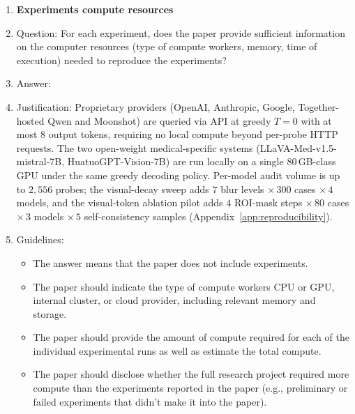 \begin{enumerate}
\item {\bf Experiments compute resources}
    \item[] Question: For each experiment, does the paper provide sufficient information on the computer resources (type of compute workers, memory, time of execution) needed to reproduce the experiments?
    \item[] Answer: \answerYes{}
    \item[] Justification: Proprietary providers (OpenAI, Anthropic, Google, Together-hosted Qwen and Moonshot) are queried via API at greedy $T{=}0$ with at most $8$ output tokens, requiring no local compute beyond per-probe HTTP requests. The two open-weight medical-specific systems (LLaVA-Med-v1.5-mistral-7B, HuatuoGPT-Vision-7B) are run locally on a single 80\,GB-class GPU under the same greedy decoding policy. Per-model audit volume is up to $2{,}556$ probes; the visual-decay sweep adds $7$ blur levels $\times\,300$ cases $\times\,4$ models, and the visual-token ablation pilot adds $4$ ROI-mask steps $\times\,80$ cases $\times\,3$ models $\times\,5$ self-consistency samples (Appendix~\ref{app:reproducibility}).
    \item[] Guidelines:
    \begin{itemize}
        \item The answer \answerNA{} means that the paper does not include experiments.
        \item The paper should indicate the type of compute workers CPU or GPU, internal cluster, or cloud provider, including relevant memory and storage.
        \item The paper should provide the amount of compute required for each of the individual experimental runs as well as estimate the total compute.
        \item The paper should disclose whether the full research project required more compute than the experiments reported in the paper (e.g., preliminary or failed experiments that didn't make it into the paper).
    \end{itemize}


\end{enumerate}
